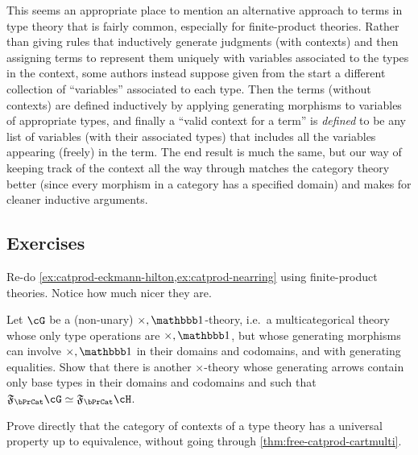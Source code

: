 \begin{rmk}
  This seems an appropriate place to mention an alternative approach to terms in type theory that is fairly common, especially for finite-product theories.
  Rather than giving rules that inductively generate judgments (with contexts) and then assigning terms to represent them uniquely with variables associated to the types in the context, some authors instead suppose given from the start a different collection of ``variables'' associated to each type.
  Then the terms (without contexts) are defined inductively by applying generating morphisms to variables of appropriate types, and finally a ``valid context for a term'' is \emph{defined} to be any list of variables (with their associated types) that includes all the variables appearing (freely) in the term.
  The end result is much the same, but our way of keeping track of the context all the way through matches the category theory better (since every morphism in a category has a specified domain) and makes for cleaner inductive arguments.
\end{rmk}


\subsection*{Exercises}

\begin{ex}\label{ex:catprod-ehnr-again}
  Re-do \cref{ex:catprod-eckmann-hilton,ex:catprod-nearring} using finite-product theories.
  Notice how much nicer they are.
\end{ex}

\begin{ex}\label{ex:catprod-thy-noprod}
  Let $\cG$ be a (non-unary) $\times,\unit$-theory, i.e.\ a multicategorical theory whose only type operations are $\times,\unit$, but whose generating morphisms can involve $\times,\unit$ in their domains and codomains, and with generating equalities.
  Show that there is another $\times$-theory \cH whose generating arrows contain only base types in their domains and codomains and such that $\F\bPrCat\cG\simeq \F\bPrCat\cH$.
\end{ex}

\begin{ex}\label{ex:catctx-univprop}
  Prove directly that the category of contexts of a type theory has a universal property up to equivalence, without going through \cref{thm:free-catprod-cartmulti}.
\end{ex}

